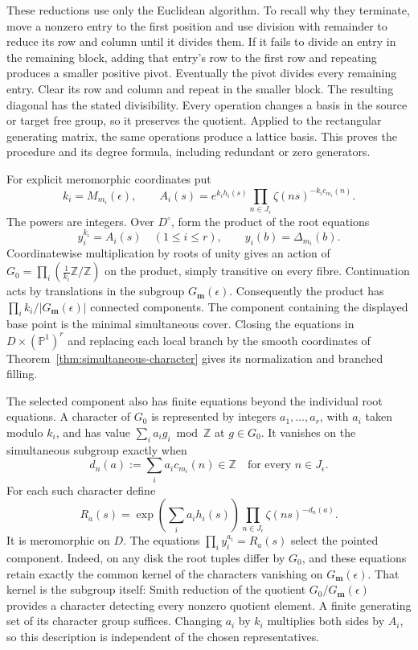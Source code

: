 These reductions use only the Euclidean algorithm.  To recall why they
terminate, move a nonzero entry to the first position and use division
with remainder to reduce its row and column until it divides them.
If it fails to divide an entry in the remaining block, adding that
entry's row to the first row and repeating produces a smaller positive
pivot.  Eventually the pivot divides every remaining entry.  Clear its
row and column and repeat in the smaller block.  The resulting diagonal
has the stated divisibility.  Every operation changes a basis in the
source or target free group, so it preserves the quotient.  Applied to
the rectangular generating matrix, the same operations produce a lattice
basis.  This proves the procedure and its degree formula, including
redundant or zero generators.

For explicit meromorphic coordinates put
\[
 k_i=M_{m_i}(\epsilon),\qquad
 A_i(s)=e^{k_i h_i(s)}
        \prod_{n\in J_\epsilon}\zeta(ns)^{-k_i c_{m_i}(n)}.
\]
The powers are integers.  Over \(D^\circ\), form the product of the
root equations
\[
 y_i^{k_i}=A_i(s)\quad(1\leq i\leq r),\qquad
 y_i(b)=\Delta_{m_i}(b).
\]
Coordinatewise multiplication by roots of unity gives an action of
\(G_0=\prod_i(\tfrac1{k_i}\mathbb Z/\mathbb Z)\) on the product,
simply transitive on every fibre. Continuation acts by translations
in the subgroup \(G_{\mathbf m}(\epsilon)\).
Consequently the product has
\(\prod_i k_i/|G_{\mathbf m}(\epsilon)|\) connected components.
The component containing the displayed base point is the minimal
simultaneous cover.  Closing the equations in
\(D\times(\mathbb P^1)^r\) and replacing each local branch by the
smooth coordinates of Theorem~\ref{thm:simultaneous-character} gives
its normalization and branched filling.

The selected component also has finite equations beyond the individual
root equations.  A character of \(G_0\) is represented by integers
\(a_1,\ldots,a_r\), with \(a_i\) taken modulo \(k_i\), and has
value \(\sum_i a_i g_i\bmod\mathbb Z\) at \(g\in G_0\).
It vanishes on the simultaneous subgroup exactly when
\[
 d_n(a):=\sum_i a_i c_{m_i}(n)\in\mathbb Z
 \quad\text{for every }n\in J_\epsilon.
\]
For each such character define
\[
 R_a(s)=\exp\left(\sum_i a_i h_i(s)\right)
          \prod_{n\in J_\epsilon}\zeta(ns)^{-d_n(a)}.
\]
It is meromorphic on \(D\).  The equations
\(\prod_i y_i^{a_i}=R_a(s)\) select the pointed component.
Indeed, on any disk the root tuples differ by \(G_0\), and these
equations retain exactly the common kernel of the characters vanishing
on \(G_{\mathbf m}(\epsilon)\).  That kernel is the subgroup itself:
Smith reduction of the quotient \(G_0/G_{\mathbf m}(\epsilon)\)
provides a character detecting every nonzero quotient element.
A finite generating set of its character group suffices.
Changing \(a_i\) by \(k_i\) multiplies both sides by \(A_i\), so
this description is independent of the chosen representatives.

